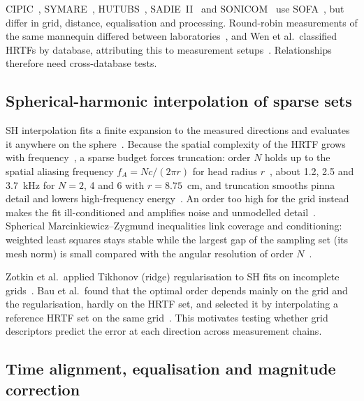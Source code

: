 \documentclass[11pt,a4paper]{article}
\begin{document}
CIPIC~\cite{algazi2001}, SYMARE~\cite{jin2014}, HUTUBS~\cite{brinkmann2019}, SADIE~II~\cite{armstrong2018} and SONICOM~\cite{engel2023} use SOFA~\cite{majdak2022}, but differ in grid, distance, equalisation and processing. Round-robin measurements of the same mannequin differed between laboratories~\cite{andreopoulou2015}, and Wen et al.\ classified HRTFs by database, attributing this to measurement setups~\cite{wen2023}. Relationships therefore need cross-database tests.

\subsection{Spherical-harmonic interpolation of sparse sets}

SH interpolation fits a finite expansion to the measured directions and evaluates it anywhere on the sphere~\cite{evans1998,duraiswami2004,romigh2015}. Because the spatial complexity of the HRTF grows with frequency~\cite{zhang2010}, a sparse budget forces truncation: order $N$ holds up to the spatial aliasing frequency $f_A=Nc/(2\pi r)$ for head radius $r$~\cite{rafaely2019,arend2023}, about 1.2, 2.5 and 3.7~kHz for $N=2$, 4 and 6 with $r=8.75$~cm, and truncation smooths pinna detail and lowers high-frequency energy~\cite{benhur2017}. An order too high for the grid instead makes the fit ill-conditioned and amplifies noise and unmodelled detail~\cite{rafaely2019}. Spherical Marcinkiewicz--Zygmund inequalities link coverage and conditioning: weighted least squares stays stable while the largest gap of the sampling set (its mesh norm) is small compared with the angular resolution of order $N$~\cite{mhaskar2001}.

Zotkin et al.\ applied Tikhonov (ridge) regularisation to SH fits on incomplete grids~\cite{zotkin2009}. Bau et al.\ found that the optimal order depends mainly on the grid and the regularisation, hardly on the HRTF set, and selected it by interpolating a reference HRTF set on the same grid~\cite{bau2022}. This motivates testing whether grid descriptors predict the error at each direction across measurement chains.

\subsection{Time alignment, equalisation and magnitude correction}
\end{document}
